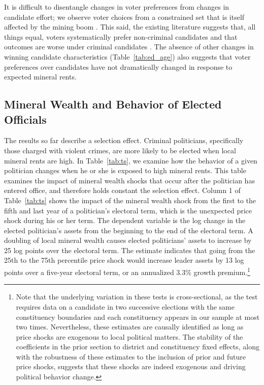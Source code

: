 \documentclass[12pt,letterpaper]{article}
\begin{document}
It is difficult to disentangle changes in voter preferences from
changes in candidate effort; we observe voter choices from a
constrained set that is itself affected by the mining boom
\cite{Pande2011,shaukat2018}. This said, the existing literature
suggests that, all things equal, voters systematically prefer
non-criminal candidates \cite{Banerjee2012b,Chauchard2014a} and that
outcomes are worse under criminal candidates
\cite{Chemin2012,Prakash2014}. The absence of other changes in winning
candidate characteristics (Table~\ref{tab:ed_age}) also suggests that
voter preferences over candidates have not dramatically changed in
response to expected mineral rents.

\subsection{Mineral Wealth and Behavior of Elected Officials}

The results so far describe a selection effect. Criminal politicians,
specifically those charged with violent crimes, are more likely to be
elected when local mineral rents are high. In Table~\ref{tab:ts}, we
examine how the behavior of a given politician changes when he or she
is exposed to high mineral rents. This table examines the impact of
mineral wealth shocks that occur after the politician has entered
office, and therefore holds constant the selection effect.  Column 1
of Table~\ref{tab:ts} shows the impact of the mineral wealth shock
from the first to the fifth and last year of a politician's electoral
term, which is the unexpected price shock during his or her term. The
dependent variable is the log change in the elected politician's
assets from the beginning to the end of the electoral term. A doubling
of local mineral wealth causes elected politicians' assets to increase
by 25 log points over the electoral term. The estimate indicates that
going from the 25th to the 75th percentile price shock would increase
leader assets by 13 log points over a five-year electoral term, or an
annualized 3.3\% growth premium.\footnote{Note that the underlying
  variation in these tests is cross-sectional, as the test requires
  data on a candidate in two successive elections with the same
  constituency boundaries and each constituency appears in our sample
  at most two times. Nevertheless, these estimates are causally
  identified as long as price shocks are exogenous to local political
  matters. The stability of the coefficients in the prior section to
  district and constituency fixed effects, along with the robustness
  of these estimates to the inclusion of prior and future price shocks,
  suggests that these shocks are indeed exogenous and driving
  political behavior change.}
\end{document}
